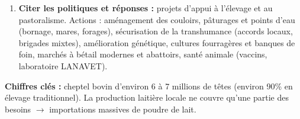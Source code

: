 \documentclass[11pt]{article}
\begin{document}
\begin{methode}
\begin{enumerate}
\begin{itemize}
        \item \textbf{Transhumance :} descente des troupeaux vers le Sud (Adamaoua, Est, Nord-Ouest) en saison sèche (novembre-mai) à la recherche d'eau et de pâturage ; remontée vers le Nord en saison des pluies (juin-octobre).
        \item \textbf{Conflits agriculteurs-éleveurs :} divagation des troupeaux dans les champs, destruction des cultures, blocage des couloirs de transhumance par l'extension des cultures, pollution des points d'eau, vols de bétail.
        \item \textbf{Causes profondes :} pression démographique et foncière, changement climatique (sécheresses au Nord $\rightarrow$ transhumance plus précoce et plus longue), insécurité, gouvernance foncière défaillante (couloirs non matérialisés, pâturages non délimités), absence d'accords locaux de transhumance.
    \end{itemize}
    \item \textbf{Citer les politiques et réponses :} projets d'appui à l'élevage et au pastoralisme. Actions : aménagement des couloirs, pâturages et points d'eau (bornage, mares, forages), sécurisation de la transhumance (accords locaux, brigades mixtes), amélioration génétique, cultures fourragères et banques de foin, marchés à bétail modernes et abattoirs, santé animale (vaccins, laboratoire LANAVET).
\end{enumerate}
\textbf{Chiffres clés :} cheptel bovin d'environ 6 à 7 millions de têtes (environ 90\% en élevage traditionnel). La production laitière locale ne couvre qu'une partie des besoins $\rightarrow$ importations massives de poudre de lait.
\end{methode}
\end{document}
